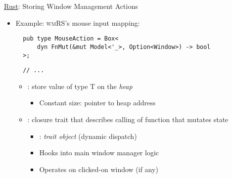 \begin{frame}[fragile]{\underline{Rust}: Storing Window Management Actions \hfill {\footnotesize \currentname}}


    \begin{itemize}

        \item Example: \textsc{wmRS}'s mouse input mapping:\\[3pt]
\begin{verbatim}
  pub type MouseAction = Box<
      dyn FnMut(&mut Model<'_>, Option<Window>) -> bool
  >;
\end{verbatim}
\begin{verbatim}
  // ...
\end{verbatim}

    \vspace*{5pt}\begin{itemize}

        \item {}: store value of type T on the \textit{heap}
            \begin{itemize}
                \item Constant size: pointer to heap address
            \end{itemize}

        \item {}: closure trait that describes calling of function that mutates state
            \begin{itemize}
                \item {}: \textit{trait object} (dynamic dispatch)
                \item Hooks into main window manager logic
                \item Operates on clicked-on window (if any)
            \end{itemize}

    \end{itemize}

    \end{itemize}

    \vfill

\end{frame}

